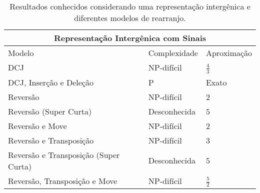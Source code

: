 \begin{table}[!htb]\label{table:GNCKDPJY}
  \caption[Resultados conhecidos considerando uma representação intergênica e diferentes modelos de rearranjo.]{Resultados conhecidos considerando uma representação intergênica e diferentes modelos de rearranjo.}
  \centering
  \begin{tabular}{|p{8cm}|p{3cm}|p{3cm}|}
    \hline
    \multicolumn{3}{|c|}{Representação Intergênica com Sinais}                                                                                   \\ \hline
    Modelo                                  & Complexidade                                 & Aproximação                                         \\ \hline
    DCJ                                     & NP-difícil~\cite{2017-fertin-etal}           & $\frac{4}{3}$~\cite{2017-fertin-etal}               \\ \hline
    DCJ, Inserção e Deleção                 & P~\cite{2016b-bulteau-etal}                  & Exato~\cite{2016b-bulteau-etal}                     \\ \hline
    Reversão                                & NP-difícil~\cite{2021b-oliveira-etal}        & $2$~\cite{2021b-oliveira-etal}                      \\ \hline
    Reversão (Super Curta)                  & Desconhecida                                 & $5$~\cite{2019c-oliveira-etal}                      \\ \hline
    Reversão e Move                         & NP-difícil~\cite{2022b-brito-etal}           & $2$~\cite{2022b-brito-etal}                         \\ \hline
    Reversão e Transposição                 & NP-difícil~\cite{2021a-oliveira-etal}        & $3$~\cite{2021b-oliveira-etal}                      \\ \hline
    Reversão e Transposição (Super Curta)   & Desconhecida                                 & $5$~\cite{2019c-oliveira-etal}                      \\ \hline
    Reversão, Transposição e Move           & NP-difícil~\cite{2021a-oliveira-etal}        & $\frac{5}{2}$~\cite{2021a-oliveira-etal}            \\ \hline
  \end{tabular}

  \hfill \break


\end{table}
